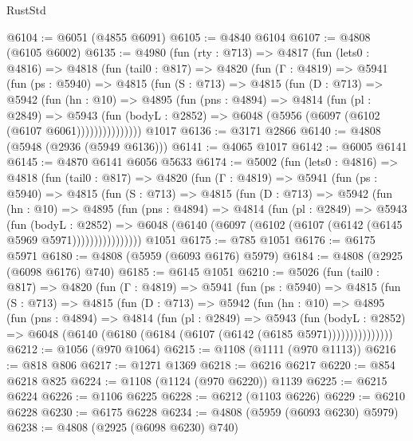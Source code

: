 \begin{lexlean}{RustStd}
\begin{coremodule}
@6104 := @6051 (@4855 @6091)
@6105 := @4840 @6104
@6107 := @4808 (@6105 @6002)
@6135 := @4980
    (fun (rty : @713) =>
    @4817
      (fun (lets0 : @4816) =>
      @4818
        (fun (tail0 : @817) =>
        @4820
          (fun (Γ : @4819) =>
          @5941
            (fun (ps : @5940) =>
            @4815
              (fun (S : @713) =>
              @4815
                (fun (D : @713) =>
                @5942
                  (fun (hn : @10) =>
                  @4895
                    (fun (pns : @4894) =>
                    @4814
                      (fun (pl : @2849) =>
                      @5943
                        (fun (bodyL : @2852) =>
                        @6048 (@5956 (@6097 (@6102 (@6107 @6061)))))))))))))))
    @1017
@6136 := @3171 @2866
@6140 := @4808 (@5948 (@2936 (@5949 @6136)))
@6141 := @4065 @1017
@6142 := @6005 @6141
@6145 := @4870 @6141 @6056 @5633
@6174 := @5002
    (fun (lets0 : @4816) =>
    @4818
      (fun (tail0 : @817) =>
      @4820
        (fun (Γ : @4819) =>
        @5941
          (fun (ps : @5940) =>
          @4815
            (fun (S : @713) =>
            @4815
              (fun (D : @713) =>
              @5942
                (fun (hn : @10) =>
                @4895
                  (fun (pns : @4894) =>
                  @4814
                    (fun (pl : @2849) =>
                    @5943
                      (fun (bodyL : @2852) =>
                      @6048 (@6140 (@6097 (@6102 (@6107 (@6142 (@6145 @5969 @5971))))))))))))))))
    @1051
@6175 := @785 @1051
@6176 := @6175 @5971
@6180 := @4808 (@5959 (@6093 @6176) @5979)
@6184 := @4808 (@2925 (@6098 @6176) @740)
@6185 := @6145 @1051
@6210 := @5026
    (fun (tail0 : @817) =>
    @4820
      (fun (Γ : @4819) =>
      @5941
        (fun (ps : @5940) =>
        @4815
          (fun (S : @713) =>
          @4815
            (fun (D : @713) =>
            @5942
              (fun (hn : @10) =>
              @4895
                (fun (pns : @4894) =>
                @4814
                  (fun (pl : @2849) =>
                  @5943
                    (fun (bodyL : @2852) =>
                    @6048 (@6140 (@6180 (@6184 (@6107 (@6142 (@6185 @5971)))))))))))))))
@6212 := @1056 (@970 @1064)
@6215 := @1108 (@1111 (@970 @1113))
@6216 := @818 @806
@6217 := @1271 @1369
@6218 := @6216 @6217
@6220 := @854 @6218 @825
@6224 := @1108 (@1124 (@970 @6220)) @1139
@6225 := @6215 @6224
@6226 := @1106 @6225
@6228 := @6212 (@1103 @6226)
@6229 := @6210 @6228
@6230 := @6175 @6228
@6234 := @4808 (@5959 (@6093 @6230) @5979)
@6238 := @4808 (@2925 (@6098 @6230) @740)

\end{coremodule}
\end{lexlean}
